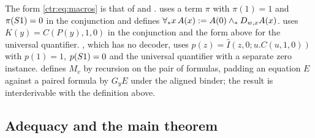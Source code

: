 \begin{remark}\label{ctr:rem:macrovariants}
The form \eqref{ctr:eq:macros} is that of  and
.  uses a term $\pi$ with $\pi(1)=1$ and
$\pi(S 1)=0$ in the conjunction and defines
$\forall_*x\,A(x)\mathrel{:=} A(0)\land_*D_{w,x}A(x)$.  uses
$K(y)=C(P(y),1,0)$ in the conjunction and the form above for the universal quantifier.
, which has no decoder, uses
$p(z)=\widehat I(z,0;u.C(u,1,0))$ with $p(1)=1$, $p(S 1)=0$ and the universal quantifier
with a separate zero instance.  defines $M_v$ by recursion on the
pair of formulas, padding an equation $E$ against a paired formula by $G_yE$ under the
aligned binder; the result is interderivable with the definition above.
\end{remark}

\subsection{Adequacy and the main theorem}

